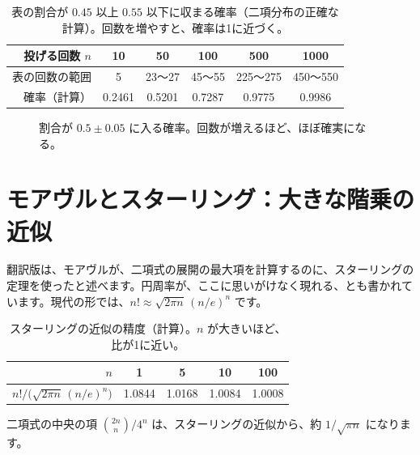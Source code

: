 \documentclass[a4paper,11pt,openany]{ltjsbook}
\begin{document}
\begin{table}[htbp]
\centering
\begin{tabular}{r|ccccc}
\toprule
投げる回数 $n$ & 10 & 50 & 100 & 500 & 1000\\
\midrule
表の回数の範囲 & 5 & 23〜27 & 45〜55 & 225〜275 & 450〜550\\
確率（計算） & 0.2461 & 0.5201 & 0.7287 & 0.9775 & 0.9986\\
\bottomrule
\end{tabular}
\caption{表の割合が $0.45$ 以上 $0.55$ 以下に収まる確率（二項分布の正確な計算）。回数を増やすと、確率は1に近づく。}
\end{table}

\begin{figure}[htbp]
\centering
{}
\caption{割合が $0.5\pm0.05$ に入る確率。回数が増えるほど、ほぼ確実になる。}
\end{figure}

\section{モアヴルとスターリング：大きな階乗の近似}

翻訳版は、モアヴルが、二項式の展開の最大項を計算するのに、スターリングの定理を使ったと述べます。円周率が、ここに思いがけなく現れる、とも書かれています。現代の形では、$n!\approx\sqrt{2\pi n}\,(n/e)^n$ です。

\begin{table}[htbp]
\centering
\begin{tabular}{r|cccc}
\toprule
$n$ & 1 & 5 & 10 & 100\\
\midrule
$n!\big/\bigl(\sqrt{2\pi n}\,(n/e)^n\bigr)$ & 1.0844 & 1.0168 & 1.0084 & 1.0008\\
\bottomrule
\end{tabular}
\caption{スターリングの近似の精度（計算）。$n$ が大きいほど、比が1に近い。}
\end{table}

二項式の中央の項 $\binom{2n}{n}/4^n$ は、スターリングの近似から、約 $1/\sqrt{\pi n}$ になります。
\end{document}
